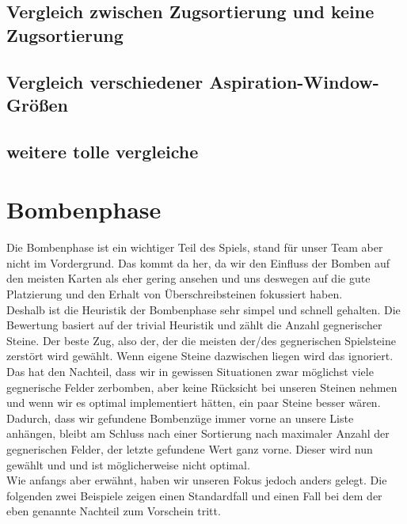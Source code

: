 \documentclass[12pt,a4paper,bibliography=totocnumbered,listof=totocnumbered]{scrartcl}
\begin{document}
    \subsection{Vergleich zwischen Zugsortierung und keine Zugsortierung}
    \vspace{1em}

    \subsection{Vergleich verschiedener Aspiration-Window-Größen}
    \vspace{1em}

	\subsection{weitere tolle vergleiche}
	\vspace{1em}

    \newpage
    \section{Bombenphase}
    \vspace{1em}
    
    Die Bombenphase ist ein wichtiger Teil des Spiels, stand für unser Team aber nicht im Vordergrund. Das kommt da her, da wir den Einfluss der Bomben auf den meisten Karten als eher gering ansehen und uns deswegen auf die gute Platzierung und den Erhalt von Überschreibsteinen fokussiert haben.\\
    Deshalb ist die Heuristik der Bombenphase sehr simpel und schnell gehalten. Die Bewertung basiert auf der trivial Heuristik und zählt die Anzahl gegnerischer Steine. Der beste Zug, also der, der die meisten der/des gegnerischen Spielsteine zerstört wird gewählt. Wenn eigene Steine dazwischen liegen wird das ignoriert. Das hat den Nachteil, dass wir in gewissen Situationen zwar möglichst viele gegnerische Felder zerbomben, aber keine Rücksicht bei unseren Steinen nehmen und wenn wir es optimal implementiert hätten, ein paar Steine besser wären. Dadurch, dass wir gefundene Bombenzüge immer vorne an unsere Liste anhängen, bleibt am Schluss nach einer Sortierung nach maximaler Anzahl der gegnerischen Felder, der letzte gefundene Wert ganz vorne. Dieser wird nun gewählt und und ist möglicherweise nicht optimal.\\
    Wie anfangs aber erwähnt, haben wir unseren Fokus jedoch anders gelegt. Die folgenden zwei Beispiele zeigen einen \glqq Standardfall\grqq{} und einen Fall bei dem der eben genannte Nachteil zum Vorschein tritt.
\end{document}
